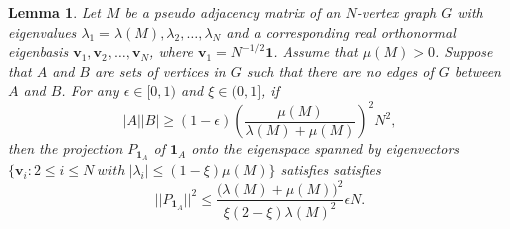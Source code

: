 \documentclass[11pt]{article}
\numberwithin{equation}{section}
\newtheorem{lemma}[theorem]{Lemma}
\def\v{\mathbf{v}}
\def\1{\mathbf{1}}
\begin{document}
\begin{lemma}\label{CrossHDboundStability}
Let $M$ be a pseudo adjacency matrix of an $N$-vertex graph $G$
with eigenvalues $\lambda_1=\lambda(M), \lambda_2, \ldots , \lambda_N$ and a corresponding real orthonormal eigenbasis
$\v_1,\v_2, \ldots ,\v_N$, where $\v_1=N^{-1/2}\1$.
Assume that $\mu(M)>0$.
Suppose that $A$ and $B$ are sets of vertices in $G$ such
that there are no edges of $G$ between $A$ and $B$.
For any $\epsilon \in [0,1)$ and $\xi\in (0,1]$,
if
$$ |A||B| \geq (1-\epsilon)\left(\frac{\mu (M)}{\lambda (M)+\mu (M)}\right)^2N^2,$$
then the projection $P_{\1_A}$ of $\1_A$ onto the eigenspace spanned by eigenvectors $\{\v_i: 2\leq i\leq N ~with~ |\lambda_i|\leq (1-\xi)\mu(M) \}$
satisfies
satisfies
$$||P_{\1_A}||^2\leq
\frac{\big(\lambda(M) + \mu(M)\big)^2 }{ \xi(2-\xi)\lambda(M) ^2} \epsilon  N.$$
\end{lemma}
\end{document}

